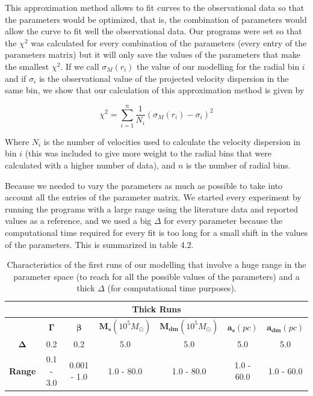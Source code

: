 This approximation method allows to fit curves to the observational data so that the parameters would be optimized, that is, the combination of parameters would allow the curve to fit well the observational data. Our programs were set so that the $\chi^{2}$ was calculated for every combination of the parameters (every entry of the parameters matrix) but it will only save the values of the parameters that make the smallest $\chi^{2}$. If we call $\sigma_{M}(r_{i})$ the value of our modelling for the radial bin $i$ and if $\sigma_{i}$ is the observational value of the projected velocity dispersion in the same bin, we show that our calculation of this approximation method is given by 

\begin{equation}
\chi^{2}=\sum_{i=1}^{n}\frac{1}{N_{i}}{\left(\sigma_{M}\left(r_{i}\right)-\sigma_{i}\right)}^{2}
\end{equation}

Where $N_{i}$ is the number of velocities used to calculate the velocity dispersion in bin $i$ (this was included to give more weight to the radial bins that were calculated with a higher number of data), and $n$ is the number of radial bins.

Because we needed to vary the parameters as much as possible to take into account all the entries of the parameter matrix. We started every experiment by running the programs with a large range using the literature data and reported values as a reference, and we used a big $\Delta$ for every parameter because the computational time required for every fit is too long for a small shift in the values of the parameters. This is summarized in table 4.2.

\begin{table}[H]
\centering
\label{my-label}
\begin{tabular}{|c|c|c|c|c|c|c|}
\hline
\multicolumn{7}{|c|}{\textbf{Thick Runs}}                                                                          \\ \hline
               & \textbf{$\mathbf{\Gamma}$} & \textbf{$\mathbf{\beta}$} & \textbf{$\mathbf{M_{s}}(10^{5} M_{\odot})$} & \textbf{$\mathbf{M_{dm}}(10^{5} M_{\odot})$} & \textbf{$\mathbf{a_{s}}(pc)$} & \textbf{$\mathbf{a_{dm}}(pc)$} \\ \hline
\textbf{$\mathbf{\Delta}$}  & 0.2  & 0.2      & 5.0     & 5.0     & 5.0      & 5.0            \\ \hline
\textbf{Range} & 0.1 - 3.0      & 0.001 - 1.0        & 1.0 - 80.0      & 1.0 - 80.0   & 1.0 - 60.0      & 1.0 - 60.0            \\ \hline
\end{tabular}
\caption[Thick runs characteristics]{Characteristics of the first runs of our modelling that involve a huge range in the parameter space (to reach for all the possible values of the parameters) and a thick $\Delta$ (for computational time purposes).}
\end{table}

